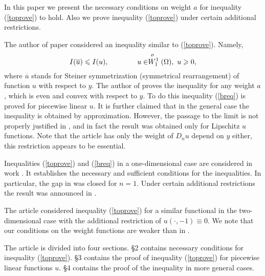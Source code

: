 In this paper we present the necessary conditions on weight $a$ for inequality (\ref{toprove}) to hold.
Also we prove inequality (\ref{toprove}) under certain additional restrictions.

The author of paper \cite{Br} considered an inequality similar to (\ref{toprove}).
Namely,
\begin{equation}
\label{breq}
I( \overline{u} ) \le I( u ), \qquad \qquad u \in \Wf( \Omega ),\ u \ge 0,
\end{equation}
where $\overline{u}$ stands for Steiner symmetrization (symmetrical rearrangement) of function $u$ with respect to $y$.
The author of \cite{Br} proves the inequality for any weight $a$, which is even and convex with respect to $y$.
To do this inequality (\ref{breq}) is proved for piecewise linear $u$.
It is further claimed that in the general case the inequality is obtained by approximation.
However, the passage to the limit is not properly justified in \cite{Br},
and in fact the result was obtained only for Lipschitz $u$ functions.
Note that the article \cite{Br} has only the weight of $D_n u$ depend on $y$ either,
this restriction appears to be essential.

Inequalities (\ref{toprove}) and (\ref{breq}) in a one-dimensional case are considered in work \cite{1dim}.
It establishes the necessary and sufficient conditions for the inequalities.
In particular, the gap in \cite{Br} was closed for $n = 1$.
Under certain additional restrictions the result was announced in \cite{DAN}.

The article \cite{Lan} considered inequality (\ref{toprove}) for a similar functional in the two-dimensional case
with the additional restriction of $u(\cdot, -1) \equiv 0$.
We note that our conditions on the weight functions are weaker than in \cite{Lan}.

The article is divided into four sections.
\S2 contains necessary conditions for inequality (\ref{toprove}).
\S3 contains the proof of inequality (\ref{toprove}) for piecewise linear functions $u$.
\S4 contains the proof of the inequality in more general cases.